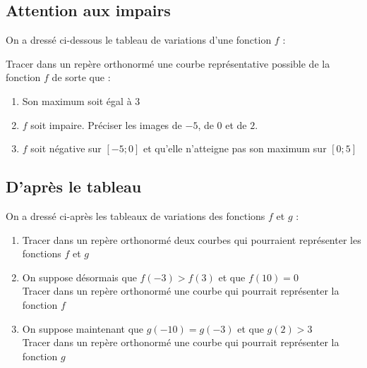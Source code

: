 \documentclass[oneside,12pt]{article}          %
\begin{document}
\subsection{Attention aux impairs}
On a dressé ci-dessous le tableau de variations d'une fonction $f$ :

Tracer dans un repère orthonormé une courbe représentative possible de la fonction $f$ de sorte que :
\begin{enumerate}
	\item Son maximum soit égal à $3$
	\item $f$ soit impaire. Préciser les images de $-5$, de $0$ et de $2$.
	\item $f$ soit négative sur $[-5;0]$ et qu'elle n'atteigne pas son maximum sur $[0;5]$
\end{enumerate}



\subsection{D'après le tableau}
On a dressé ci-après les tableaux de variations des fonctions $f$ et $g$ :

  \hspace{5mm}
\begin{enumerate}
	\item Tracer dans un repère orthonormé deux courbes qui pourraient représenter les fonctions $f$ et $g$
	\item On suppose désormais que $f(-3)>f(3)$ et que $f(10)=0$\\
	Tracer dans un repère orthonormé une courbe qui pourrait représenter la fonction $f$
	\item On suppose maintenant que $g(-10)=g(-3)$ et que $g(2)>3$\\
	Tracer dans un repère orthonormé une courbe qui pourrait représenter la fonction $g$
\end{enumerate}
\end{document}
